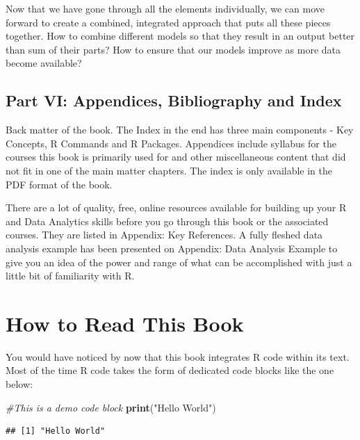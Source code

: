 \documentclass[]{krantz}
\makeatletter
\newenvironment{Shaded}{\begin{snugshade}}{\end{snugshade}}
\newcommand{\KeywordTok}[1]{\textcolor[rgb]{0.27,0.27,0.27}{\textbf{#1}}}
\newcommand{\StringTok}[1]{\textcolor[rgb]{0.5,0.5,0.5}{#1}}
\newcommand{\CommentTok}[1]{\textcolor[rgb]{0.37,0.37,0.37}{\textit{#1}}}
\newcommand{\NormalTok}[1]{#1}
\newenvironment{kframe}{%
\medskip{}
\setlength{\fboxsep}{.8em}
 \def\at@end@of@kframe{}%
 \ifinner\ifhmode%
  \def\at@end@of@kframe{\end{minipage}}%
  \begin{minipage}{\columnwidth}%
 \fi\fi%
 \def\FrameCommand##1{\hskip\@totalleftmargin \hskip-\fboxsep
 \colorbox{shadecolor}{##1}\hskip-\fboxsep
     \hskip-\linewidth \hskip-\@totalleftmargin \hskip\columnwidth}%
 \MakeFramed {\advance\hsize-\width
   \@totalleftmargin\z@ \linewidth\hsize
   \@setminipage}}%
 {\par\unskip\endMakeFramed%
 \at@end@of@kframe}
\renewenvironment{Shaded}{\begin{kframe}}{\end{kframe}}
\makeatother
\begin{document}
Now that we have gone through all the elements individually, we can move
forward to create a combined, integrated approach that puts all these
pieces together. How to combine different models so that they result in
an output better than sum of their parts? How to ensure that our models
improve as more data become available?

\subsection*{Part VI: Appendices, Bibliography and
Index}\label{part-vi-appendices-bibliography-and-index}

Back matter of the book. The Index in the end has three main components
- Key Concepts, R Commands and R Packages. Appendices include syllabus
for the courses this book is primarily used for and other miscellaneous
content that did not fit in one of the main matter chapters. The index
is only available in the PDF format of the book.

There are a lot of quality, free, online resources available for
building up your R and Data Analytics skills before you go through this
book or the associated courses. They are listed in Appendix: Key
References. A fully fleshed data analysis example has been presented on
Appendix: Data Analysis Example to give you an idea of the power and
range of what can be accomplished with just a little bit of familiarity
with R.

\section*{How to Read This Book}\label{how-to-read-this-book}


You would have noticed by now that this book integrates R code within
its text. Most of the time R code takes the form of dedicated code
blocks like the one below:

\begin{Shaded}
\begin{Highlighting}[]
\CommentTok{#This is a demo code block}
\KeywordTok{print}\NormalTok{(}\StringTok{"Hello World"}\NormalTok{)}
\end{Highlighting}
\end{Shaded}

\begin{verbatim}
## [1] "Hello World"
\end{verbatim}
\end{document}
